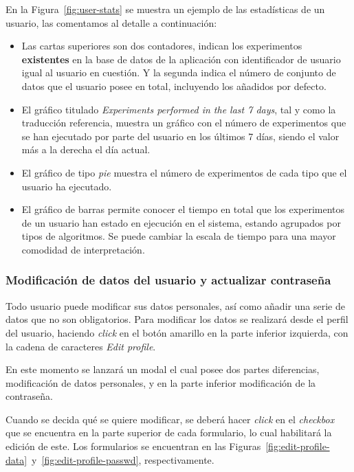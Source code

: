En la Figura~\ref{fig:user-stats} se muestra un ejemplo de las estadísticas de un usuario, las comentamos al detalle a continuación:
\begin{itemize}
\item Las cartas superiores son dos contadores, indican los experimentos \textbf{existentes} en la base de datos de la aplicación con identificador de usuario igual al usuario en cuestión. Y la segunda indica el número de conjunto de datos que el usuario posee en total, incluyendo los añadidos por defecto.
\item El gráfico titulado \textit{Experiments performed in the last 7 days}, tal y como la traducción referencia, muestra un gráfico con el número de experimentos que se han ejecutado por parte del usuario en los últimos 7 días, siendo el valor más a la derecha el día actual.
\item El gráfico de tipo \textit{pie} muestra el número de experimentos de cada tipo que el usuario ha ejecutado.
\item El gráfico de barras permite conocer el tiempo en total que los experimentos de un usuario han estado en ejecución en el sistema, estando agrupados por tipos de algoritmos. Se puede cambiar la escala de tiempo para una mayor comodidad de interpretación.
\end{itemize}


\FloatBarrier
\subsubsection{Modificación de datos del usuario y actualizar contraseña}
Todo usuario puede modificar sus datos personales, así como añadir una serie de datos que no son obligatorios. Para modificar los datos se realizará desde el perfil del usuario, haciendo \textit{click} en el botón amarillo en la parte inferior izquierda, con la cadena de caracteres \textit{Edit profile}.

En este momento se lanzará un modal el cual posee dos partes diferencias, modificación de datos personales, y en la parte inferior modificación de la contraseña.

Cuando se decida qué se quiere modificar, se deberá hacer \textit{click} en el \textit{checkbox} que se encuentra en la parte superior de cada formulario, lo cual habilitará la edición de este. Los formularios se encuentran en las Figuras~\ref{fig:edit-profile-data}~y~\ref{fig:edit-profile-passwd}, respectivamente. 


